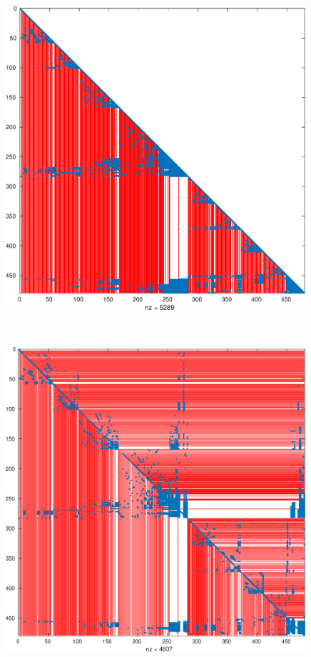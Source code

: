 \begin{figure}
 \centering
\begin{minipage}{.48\textwidth}
 \begin{center}
\includegraphics[width=0.99\textwidth]{figures/west0479-match-metis-chol-super} 
 \end{center}
\end{minipage}
~
\begin{minipage}{.48\textwidth}
  \begin{center}
\includegraphics[width=0.99\textwidth]{figures/west0479-match-metis-lu-super} 

\end{center}
\end{minipage}
\end{figure}
